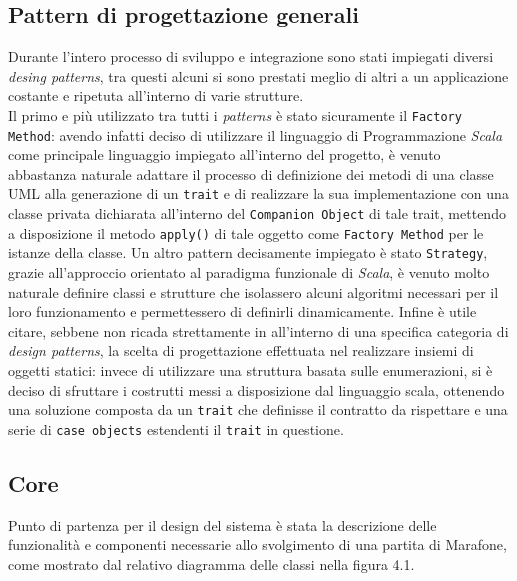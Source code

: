   \subsection {Pattern di progettazione generali}\label{subsec:details:generaldesingpattern}
  Durante l'intero processo di sviluppo e integrazione sono stati impiegati diversi \textit{desing patterns}, tra questi alcuni si sono prestati meglio di altri a un applicazione costante e ripetuta all'interno di varie strutture.\\
  Il primo e più utilizzato tra tutti i \textit{patterns} è stato sicuramente il \texttt{Factory Method}: avendo infatti deciso di utilizzare
  il linguaggio di Programmazione \textit{Scala} come principale linguaggio impiegato all'interno del progetto, è venuto abbastanza naturale adattare il processo di definizione dei metodi di una classe UML alla generazione di un \texttt{trait} e di realizzare la sua implementazione con una classe privata dichiarata all'interno del \texttt{Companion Object} di tale trait, mettendo a disposizione il metodo \texttt{apply()} di tale oggetto come \texttt{Factory Method} per le istanze della classe.
  Un altro pattern decisamente impiegato è stato \texttt{Strategy}, grazie all'approccio orientato al paradigma funzionale di \textit{Scala}, è venuto molto naturale definire classi e strutture che isolassero alcuni algoritmi necessari per il loro funzionamento e permettessero di definirli dinamicamente.
  Infine è utile citare, sebbene non ricada strettamente in all'interno di una specifica categoria di \textit{design patterns}, la scelta di progettazione effettuata nel realizzare insiemi di oggetti statici: invece di utilizzare una struttura basata sulle enumerazioni, si è deciso di sfruttare i costrutti messi a disposizione dal linguaggio scala, ottenendo una soluzione composta da un \texttt{trait} che definisse il contratto da rispettare e una serie di \texttt{case objects} estendenti il \texttt{trait} in questione.

  \subsection {Core}\label{subsec:details:core}
  Punto di partenza per il design del sistema è stata la descrizione delle funzionalità e componenti necessarie allo svolgimento di una partita di Marafone, come mostrato dal relativo diagramma delle classi nella figura 4.1.

